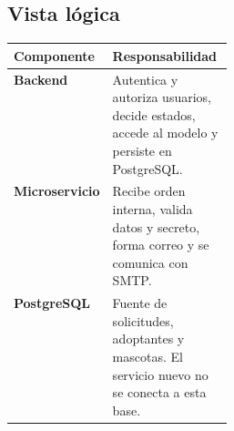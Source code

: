 \documentclass[11pt,a4paper]{article}
\begin{document}
\subsection{Vista lógica}
\begin{center}\end{center}
\begin{tabularx}{\linewidth}{>{\bfseries}p{0.28\linewidth}X}
\toprule Componente & Responsabilidad\\\midrule
Backend & Autentica y autoriza usuarios, decide estados, accede al modelo y persiste en PostgreSQL.\\
Microservicio & Recibe orden interna, valida datos y secreto, forma correo y se comunica con SMTP.\\
PostgreSQL & Fuente de solicitudes, adoptantes y mascotas. El servicio nuevo no se conecta a esta base.\\
\bottomrule\end{tabularx}
\end{document}
